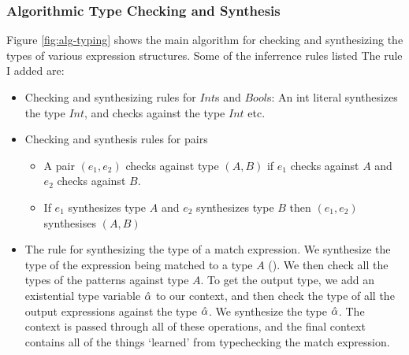 \subsubsection{Algorithmic Type Checking and Synthesis}
Figure \ref{fig:alg-typing} shows the main algorithm for checking and synthesizing the types of various expression structures. Some of the inferrence rules listed The rule I added are: 
\begin{itemize}
    \item Checking and synthesizing rules for $Int$s and $Bool$s: An int literal synthesizes the type $Int$, and checks against the type $Int$ etc. 
    \item Checking and synthesis rules for pairs
    \begin{itemize}
        \item A pair $(e_1, e_2)$ checks against type $(A, B)$ if $e_1$ checks against $A$ and $e_2$ checks against $B$. 
        \item If $e_1$ synthesizes type $A$ and $e_2$ synthesizes type $B$ then $(e_1, e_2)$ synthesises $(A, B)$
    \end{itemize}
    \item The rule for synthesizing the type of a match expression. We synthesize the type of the expression being matched to a type $A$ (). We then check all the types of the patterns against type $A$. To get the output type, we add an existential type variable $\hat{\alpha}$ to our context, and then check the type of all the output expressions against the type $\hat{\alpha}$. We synthesize the type $\hat{\alpha}$. The context is passed through all of these operations, and the final context contains all of the things `learned' from typechecking the match expression. 
\end{itemize}

